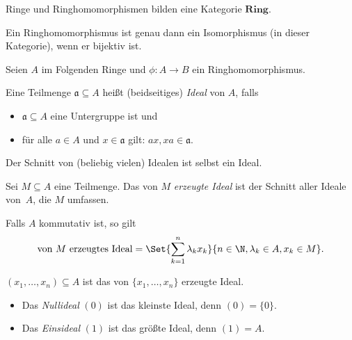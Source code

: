 \documentclass{cheat-sheet}
\newcommand{\Ring}{\mathbf{Ring}} %
\newcommand{\aaa}{\mathfrak{a}}
\begin{document}
\begin{bem}
  Ringe und Ringhomomorphismen bilden eine Kategorie $\Ring$.
\end{bem}

\begin{lem}
  Ein Ringhomomorphismus ist genau dann ein Isomorphismus (in dieser Kategorie), wenn er bijektiv ist.
\end{lem}

\begin{konv}
  Seien $A$ im Folgenden Ringe und $\phi : A \to B$ ein Ringhomomorphismus.
\end{konv}



\begin{defn}
  Eine Teilmenge $\aaa \subseteq A$ heißt (beidseitiges) \emph{Ideal} von $A$, falls
  \begin{itemize}
    \item $\aaa \subseteq A$ eine Untergruppe ist und
    \item für alle $a \in A$ und $x \in \aaa$ gilt: $ax, xa \in \aaa$.
  \end{itemize}
\end{defn}

\begin{lem}
  Der Schnitt von (beliebig vielen) Idealen ist selbst ein Ideal.
\end{lem}

\begin{defn}
  Sei $M \subseteq A$ eine Teilmenge.
  Das von $M$ \emph{erzeugte Ideal} ist der Schnitt aller Ideale von~$A$, die $M$ umfassen.
\end{defn}

\begin{bem}
  Falls $A$ kommutativ ist, so gilt
  \[
    \text{von $M$ erzeugtes Ideal} = \Set{\sum_{k=1}^n \lambda_k x_k}{n \in \N, \lambda_k \in A, x_k \in M}.
  \]
\end{bem}

\begin{nota}
  $(x_1, \ldots, x_n) \subseteq A$ ist das von $\{ x_1, \ldots, x_n \}$ erzeugte Ideal.
\end{nota}

\begin{bem}
  \begin{minipage}[t]{0.85 \linewidth}
    \begin{itemize}
      \item Das \emph{Nullideal} $(0)$ ist das kleinste Ideal, denn $(0) = \{ 0 \}$.
      \item Das \emph{Einsideal} $(1)$ ist das größte Ideal, denn $(1) = A$.
    \end{itemize}
  \end{minipage}
\end{bem}
\end{document}
